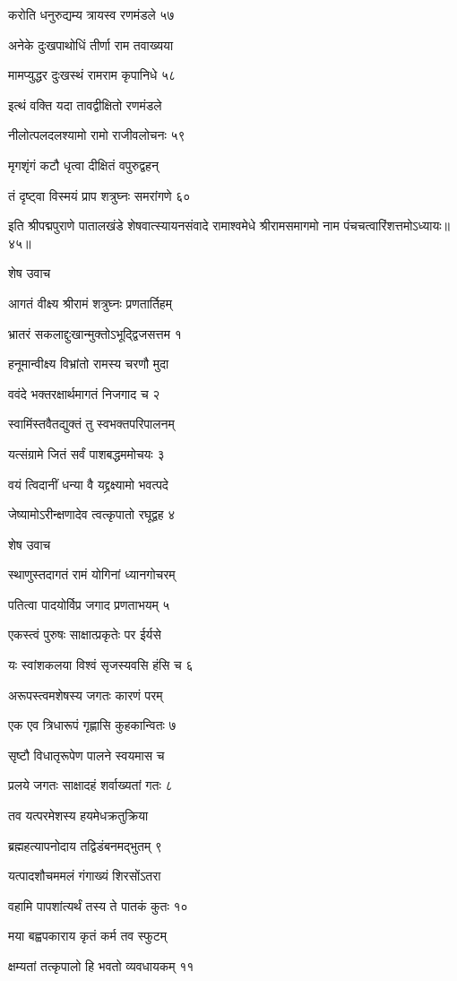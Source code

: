 करोति धनुरुद्यम्य त्रायस्व रणमंडले ५७

अनेके दुःखपाथोधिं तीर्णा राम तवाख्यया

मामप्युद्धर दुःखस्थं रामराम कृपानिधे ५८

इत्थं वक्ति यदा तावद्वीक्षितो रणमंडले

नीलोत्पलदलश्यामो रामो राजीवलोचनः ५९

मृगशृंगं कटौ धृत्वा दीक्षितं वपुरुद्वहन्

तं दृष्ट्वा विस्मयं प्राप शत्रुघ्नः समरांगणे ६०

इति श्रीपद्मपुराणे पातालखंडे शेषवात्स्यायनसंवादे रामाश्वमेधे श्रीरामसमागमो नाम पंचचत्वारिंशत्तमोऽध्यायः॥४५॥


शेष उवाच

आगतं वीक्ष्य श्रीरामं शत्रुघ्नः प्रणतार्तिहम्

भ्रातरं सकलाद्दुःखान्मुक्तोऽभूद्द्विजसत्तम १

हनूमान्वीक्ष्य विभ्रांतो रामस्य चरणौ मुदा

ववंदे भक्तरक्षार्थमागतं निजगाद च २

स्वामिंस्तवैतद्युक्तं तु स्वभक्तपरिपालनम्

यत्संग्रामे जितं सर्वं पाशबद्धममोचयः ३

वयं त्विदानीं धन्या वै यद्द्रक्ष्यामो भवत्पदे

जेष्यामोऽरीन्क्षणादेव त्वत्कृपातो रघूद्वह ४

शेष उवाच

स्थाणुस्तदागतं रामं योगिनां ध्यानगोचरम्

पतित्वा पादयोर्विप्र जगाद प्रणताभयम् ५

एकस्त्वं पुरुषः साक्षात्प्रकृतेः पर ईर्यसे

यः स्वांशकलया विश्वं सृजस्यवसि हंसि च ६

अरूपस्त्वमशेषस्य जगतः कारणं परम्

एक एव त्रिधारूपं गृह्णासि कुहकान्वितः ७

सृष्टौ विधातृरूपेण पालने स्वयमास च

प्रलये जगतः साक्षादहं शर्वाख्यतां गतः ८

तव यत्परमेशस्य हयमेधक्रतुक्रिया

ब्रह्महत्यापनोदाय तद्विडंबनमद्भुतम् ९

यत्पादशौचममलं गंगाख्यं शिरसोंऽतरा

वहामि पापशांत्यर्थं तस्य ते पातकं कुतः १०

मया बह्वपकाराय कृतं कर्म तव स्फुटम्

क्षम्यतां तत्कृपालो हि भवतो व्यवधायकम् ११

